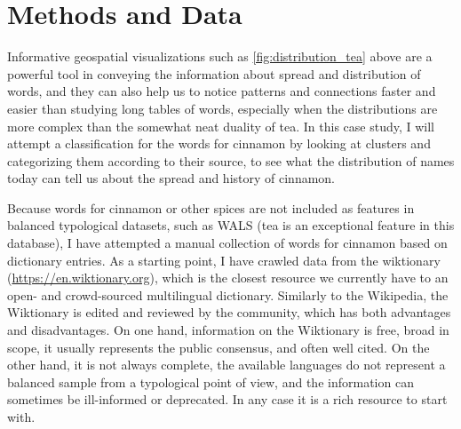\section{Methods and Data}

Informative geospatial visualizations such as \cref{fig:distribution_tea} above are a powerful tool in conveying the information about spread and distribution of words, and they can also help us to notice patterns and connections faster and easier than studying long tables of words, especially when the distributions are more complex than the somewhat neat duality of tea. In this case study, I will attempt a classification for the words for cinnamon by looking at clusters and categorizing them according to their source, to see what the distribution of names today can tell us about the spread and history of cinnamon.

Because words for cinnamon or other spices are not included as features in balanced typological datasets, such as \gls{WALS} (tea is an exceptional feature in this database), I have attempted a manual collection of words for cinnamon based on dictionary entries. As a starting point, I have crawled data from the \gls{wiktionary} (\url{https://en.wiktionary.org}), which is the closest resource we currently have to an open- and crowd-sourced multilingual dictionary. Similarly to the Wikipedia, the Wiktionary is edited and reviewed by the community, which has both advantages and disadvantages. On one hand, information on the Wiktionary is free, broad in scope, it usually represents the public consensus, and often well cited. On the other hand, it is not always complete, the available languages do not represent a balanced sample from a typological point of view, and the information can sometimes be ill-informed or deprecated. In any case it is a rich resource to start with. 

